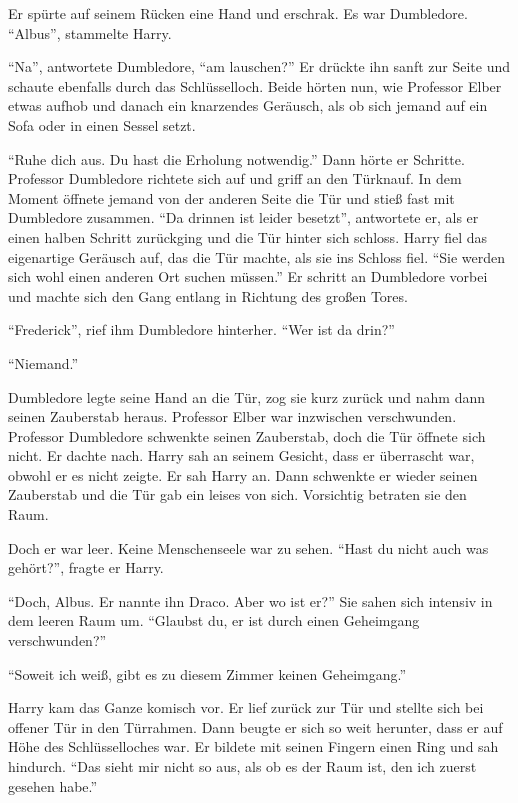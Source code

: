 Er spürte auf seinem Rücken eine Hand und erschrak. Es war Dumbledore. \enquote{Albus}, stammelte Harry.

\enquote{Na}, antwortete Dumbledore, \enquote{am lauschen?} Er drückte ihn sanft zur Seite und schaute ebenfalls durch das Schlüsselloch. Beide hörten nun, wie Professor Elber etwas aufhob und danach ein knarzendes Geräusch, als ob sich jemand auf ein Sofa oder in einen Sessel setzt.

\enquote{Ruhe dich aus. Du hast die Erholung notwendig.} Dann hörte er Schritte. Professor Dumbledore richtete sich auf und griff an den Türknauf. In dem Moment öffnete jemand von der anderen Seite die Tür und stieß fast mit Dumbledore zusammen. \enquote{Da drinnen ist leider besetzt}, antwortete er, als er einen halben Schritt zurückging und die Tür hinter sich schloss. Harry fiel das eigenartige Geräusch auf, das die Tür machte, als sie ins Schloss fiel. \enquote{Sie werden sich wohl einen anderen Ort suchen müssen.} Er schritt an Dumbledore vorbei und machte sich den Gang entlang in Richtung des großen Tores.

\enquote{Frederick}, rief ihm Dumbledore hinterher. \enquote{Wer ist da drin?}

\enquote{Niemand.}

Dumbledore legte seine Hand an die Tür, zog sie kurz zurück und nahm dann seinen Zauberstab heraus. Professor Elber war inzwischen verschwunden. Professor Dumbledore schwenkte seinen Zauberstab, doch die Tür öffnete sich nicht. Er dachte nach. Harry sah an seinem Gesicht, dass er überrascht war, obwohl er es nicht zeigte. Er sah Harry an. Dann schwenkte er wieder seinen Zauberstab und die Tür gab ein leises  von sich. Vorsichtig betraten sie den Raum.

Doch er war leer. Keine Menschenseele war zu sehen. \enquote{Hast du nicht auch was gehört?}, fragte er Harry.

\enquote{Doch, Albus. Er nannte ihn Draco. Aber wo ist er?} Sie sahen sich intensiv in dem leeren Raum um. \enquote{Glaubst du, er ist durch einen Geheimgang verschwunden?}

\enquote{Soweit ich weiß, gibt es zu diesem Zimmer keinen Geheimgang.}

Harry kam das Ganze komisch vor. Er lief zurück zur Tür und stellte sich bei offener Tür in den Türrahmen. Dann beugte er sich so weit herunter, dass er auf Höhe des Schlüsselloches war. Er bildete mit seinen Fingern einen Ring und sah hindurch. \enquote{Das sieht mir nicht so aus, als ob es der Raum ist, den ich zuerst gesehen habe.}

